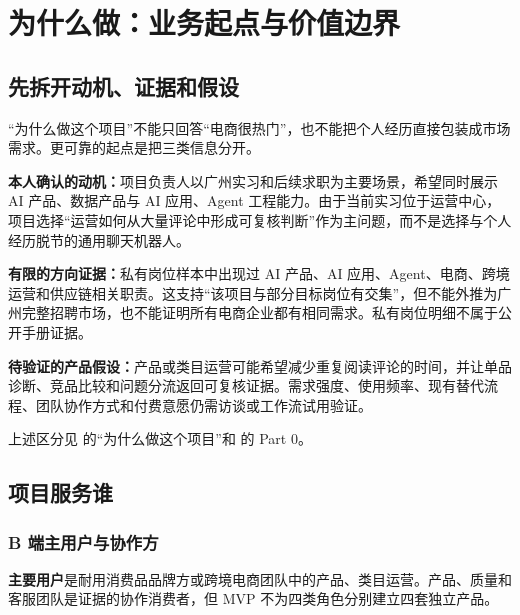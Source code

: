 \chapter{为什么做：业务起点与价值边界}

\section{先拆开动机、证据和假设}

“为什么做这个项目”不能只回答“电商很热门”，也不能把个人经历直接包装成市场需求。更可靠的起点是把三类信息分开。

\begin{factbox}
\textbf{本人确认的动机：}项目负责人以广州实习和后续求职为主要场景，希望同时展示 AI 产品、数据产品与 AI 应用、Agent 工程能力。由于当前实习位于运营中心，项目选择“运营如何从大量评论中形成可复核判断”作为主问题，而不是选择与个人经历脱节的通用聊天机器人。
\end{factbox}

\begin{inferencebox}
\textbf{有限的方向证据：}私有岗位样本中出现过 AI 产品、AI 应用、Agent、电商、跨境运营和供应链相关职责。这支持“该项目与部分目标岗位有交集”，但不能外推为广州完整招聘市场，也不能证明所有电商企业都有相同需求。私有岗位明细不属于公开手册证据。
\end{inferencebox}

\begin{boundarybox}
\textbf{待验证的产品假设：}产品或类目运营可能希望减少重复阅读评论的时间，并让单品诊断、竞品比较和问题分流返回可复核证据。需求强度、使用频率、现有替代流程、团队协作方式和付费意愿仍需访谈或工作流试用验证。
\end{boundarybox}

上述区分见  的“为什么做这个项目”和  的 Part 0。

\section{项目服务谁}

\subsection{B 端主用户与协作方}

\begin{factbox}
\textbf{主要用户}是耐用消费品品牌方或跨境电商团队中的产品、类目运营。产品、质量和客服团队是证据的协作消费者，但 MVP 不为四类角色分别建立四套独立产品。
\end{factbox}

